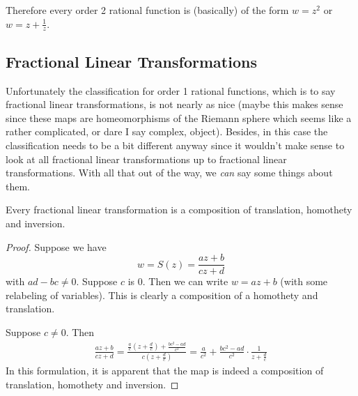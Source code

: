 Therefore every order 2 rational function is (basically) of the form $w = z^2$ or $w = z + \frac{1}{z}$.

\subsection{Fractional Linear Transformations}
Unfortunately the classification for order 1 rational functions, which is to say fractional linear transformations, is not nearly as nice (maybe this makes sense since these maps are homeomorphisms of the Riemann sphere which seems like a rather complicated, or dare I say complex, object). Besides, in this case the classification needs to be a bit different anyway since it wouldn't make sense to look at all fractional linear transformations up to fractional linear transformations. With all that out of the way, we \textit{can} say some things about them.

\begin{proposition}\label{prop:frac-lin-trans-decompose}
Every fractional linear transformation is a composition of translation, homothety and inversion. 
\end{proposition}
\begin{proof}
Suppose we have 
$$w = S(z) = \frac{az + b}{cz + d}$$
with $ad - bc \neq 0$. Suppose $c$ is 0. Then we can write $w = az + b$ (with some relabeling of variables). This is clearly a composition of a homothety and translation.

Suppose $c \neq 0$. Then
\begin{align*}
    \frac{az + b}{cz + d} = \frac{\frac{a}{c} \left( z + \frac{d}{c} \right) + \frac{bc^2 - ad}{c^2}}{c \left(z + \frac{d}{c} \right)} = \frac{a}{c^2} + \frac{bc^2 - ad}{c^2} \cdot \frac{1}{z + \frac{d}{c}}
\end{align*}
In this formulation, it is apparent that the map is indeed a composition of translation, homothety and inversion.
\end{proof}

